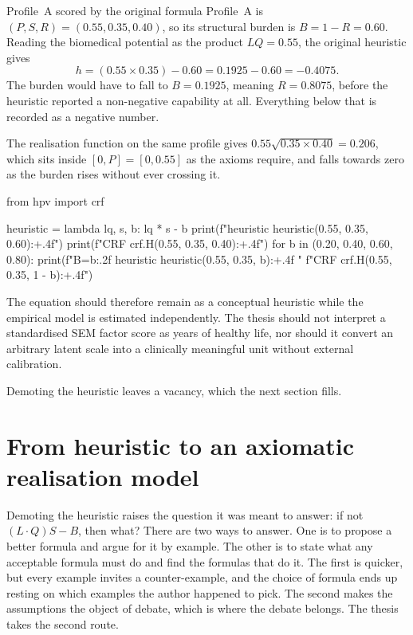 \begin{workedexample}{Profile~A scored by the original formula}
Profile~A is $(P,S,R)=(0.55,0.35,0.40)$, so its structural burden is
$B=1-R=0.60$. Reading the biomedical potential as the product $LQ=0.55$, the
original heuristic gives
\[
  h=(0.55\times0.35)-0.60=0.1925-0.60=-0.4075 .
\]
The burden would have to fall to $B=0.1925$, meaning $R=0.8075$, before the
heuristic reported a non-negative capability at all. Everything below that is
recorded as a negative number.

The realisation function on the same profile gives
$0.55\sqrt{0.35\times0.40}=0.206$, which sits inside $[0,P]=[0,0.55]$ as the
axioms require, and falls towards zero as the burden rises without ever
crossing it.

\begin{wecode}[Python]
from hpv import crf

heuristic = lambda lq, s, b: lq * s - b
print(f"heuristic {heuristic(0.55, 0.35, 0.60):+.4f}")
print(f"CRF       {crf.H(0.55, 0.35, 0.40):+.4f}")
for b in (0.20, 0.40, 0.60, 0.80):
    print(f"B={b:.2f}  heuristic {heuristic(0.55, 0.35, b):+.4f}  "
          f"CRF {crf.H(0.55, 0.35, 1 - b):+.4f}")
\end{wecode}

\end{workedexample}

The equation should therefore remain as a conceptual heuristic while the empirical model is estimated independently. The thesis should not interpret a standardised SEM factor score as years of healthy life, nor should it convert an arbitrary latent scale into a clinically meaningful unit without external calibration.

Demoting the heuristic leaves a vacancy, which the next section fills.

\section{From heuristic to an axiomatic realisation model}
\label{sec:intro-maths}

Demoting the heuristic raises the question it was meant to answer: if not $(L\cdot Q)S-B$, then what? There are two ways to answer. One is to propose a better formula and argue for it by example. The other is to state what any acceptable formula must do and find the formulas that do it. The first is quicker, but every example invites a counter-example, and the choice of formula ends up resting on which examples the author happened to pick. The second makes the assumptions the object of debate, which is where the debate belongs. The thesis takes the second route.

